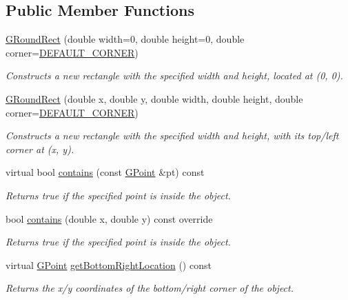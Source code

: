 \subsection*{Public Member Functions}
\begin{DoxyCompactItemize}
\item 
\mbox{\hyperlink{classsgl_1_1GRoundRect_a4e4a8dae719dc671caf5bbfda7ca158a}{G\+Round\+Rect}} (double width=0, double height=0, double corner=\mbox{\hyperlink{classsgl_1_1GRoundRect_a6e0fd235a5cfe88a0b0825202575bed9}{D\+E\+F\+A\+U\+L\+T\+\_\+\+C\+O\+R\+N\+ER}})
\begin{DoxyCompactList}\small\item\em Constructs a new rectangle with the specified width and height, located at (0, 0). \end{DoxyCompactList}\item 
\mbox{\hyperlink{classsgl_1_1GRoundRect_a7ad0ccdd10c65a52fc77a7e9634ae58b}{G\+Round\+Rect}} (double x, double y, double width, double height, double corner=\mbox{\hyperlink{classsgl_1_1GRoundRect_a6e0fd235a5cfe88a0b0825202575bed9}{D\+E\+F\+A\+U\+L\+T\+\_\+\+C\+O\+R\+N\+ER}})
\begin{DoxyCompactList}\small\item\em Constructs a new rectangle with the specified width and height, with its top/left corner at (x, y). \end{DoxyCompactList}\item 
virtual bool \mbox{\hyperlink{classsgl_1_1GObject_a1dbc9dafaae51958112dbe1267a1f547}{contains}} (const \mbox{\hyperlink{structsgl_1_1GPoint}{G\+Point}} \&pt) const
\begin{DoxyCompactList}\small\item\em Returns {\ttfamily true} if the specified point is inside the object. \end{DoxyCompactList}\item 
bool \mbox{\hyperlink{classsgl_1_1GRoundRect_ad973a1d55799d3a73bf8b04986cd804e}{contains}} (double x, double y) const override
\begin{DoxyCompactList}\small\item\em Returns {\ttfamily true} if the specified point is inside the object. \end{DoxyCompactList}\item 
virtual \mbox{\hyperlink{structsgl_1_1GPoint}{G\+Point}} \mbox{\hyperlink{classsgl_1_1GObject_a0d41183bf6b08de66fe3907551aab0d7}{get\+Bottom\+Right\+Location}} () const
\begin{DoxyCompactList}\small\item\em Returns the x/y coordinates of the bottom/right corner of the object. \end{DoxyCompactList}\item 

\end{DoxyCompactItemize}
